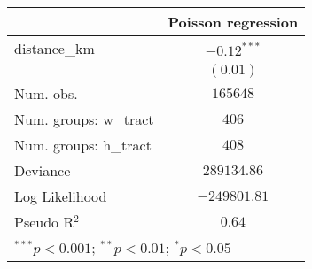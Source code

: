 
\begin{tabular}{l c}
\hline
 & Poisson regression \\
\hline
distance\_km          & $-0.12^{***}$ \\
                      & $(0.01)$      \\
\hline
Num. obs.             & $165648$      \\
Num. groups: w\_tract & $406$         \\
Num. groups: h\_tract & $408$         \\
Deviance              & $289134.86$   \\
Log Likelihood        & $-249801.81$  \\
Pseudo R$^2$          & $0.64$        \\
\hline
\multicolumn{2}{l}{\scriptsize{$^{***}p<0.001$; $^{**}p<0.01$; $^{*}p<0.05$}}
\end{tabular}
